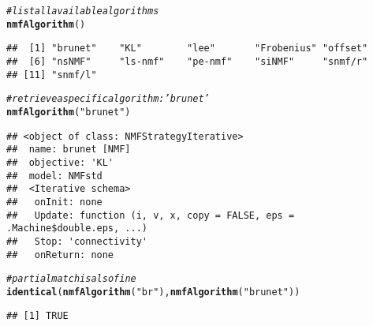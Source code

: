 \documentclass[a4paper]{article}\usepackage[]{graphicx}\usepackage[]{color}
\makeatletter
\newcommand{\hlstr}[1]{\textcolor[rgb]{0.192,0.494,0.8}{#1}}%
\newcommand{\hlcom}[1]{\textcolor[rgb]{0.678,0.584,0.686}{\textit{#1}}}%
\newcommand{\hlstd}[1]{\textcolor[rgb]{0.345,0.345,0.345}{#1}}%
\newcommand{\hlkwd}[1]{\textcolor[rgb]{0.737,0.353,0.396}{\textbf{#1}}}%
\newenvironment{kframe}{%
 \def\at@end@of@kframe{}%
 \ifinner\ifhmode%
  \def\at@end@of@kframe{\end{minipage}}%
  \begin{minipage}{\columnwidth}%
 \fi\fi%
 \def\FrameCommand##1{\hskip\@totalleftmargin \hskip-\fboxsep
 \colorbox{shadecolor}{##1}\hskip-\fboxsep
     \hskip-\linewidth \hskip-\@totalleftmargin \hskip\columnwidth}%
 \MakeFramed {\advance\hsize-\width
   \@totalleftmargin\z@ \linewidth\hsize
   \@setminipage}}%
 {\par\unskip\endMakeFramed%
 \at@end@of@kframe}
\newenvironment{knitrout}{}{} %
\makeatother
\begin{document}
\begin{knitrout}
\color{fgcolor}\begin{kframe}
\begin{alltt}
\hlcom{# list all available algorithms}
\hlkwd{nmfAlgorithm}\hlstd{()}
\end{alltt}
\begin{verbatim}
##  [1] "brunet"    "KL"        "lee"       "Frobenius" "offset"   
##  [6] "nsNMF"     "ls-nmf"    "pe-nmf"    "siNMF"     "snmf/r"   
## [11] "snmf/l"
\end{verbatim}
\begin{alltt}
\hlcom{# retrieve a specific algorithm: 'brunet'}
\hlkwd{nmfAlgorithm}\hlstd{(}\hlstr{"brunet"}\hlstd{)}
\end{alltt}
\begin{verbatim}
## <object of class: NMFStrategyIterative>
##  name: brunet [NMF]
##  objective: 'KL' 
##  model: NMFstd 
##  <Iterative schema>
##   onInit: none
##   Update: function (i, v, x, copy = FALSE, eps = .Machine$double.eps, ...)
##   Stop: 'connectivity'
##   onReturn: none
\end{verbatim}
\begin{alltt}
\hlcom{# partial match is also fine}
\hlkwd{identical}\hlstd{(}\hlkwd{nmfAlgorithm}\hlstd{(}\hlstr{"br"}\hlstd{),} \hlkwd{nmfAlgorithm}\hlstd{(}\hlstr{"brunet"}\hlstd{))}
\end{alltt}
\begin{verbatim}
## [1] TRUE
\end{verbatim}
\end{kframe}
\end{knitrout}
\end{document}
